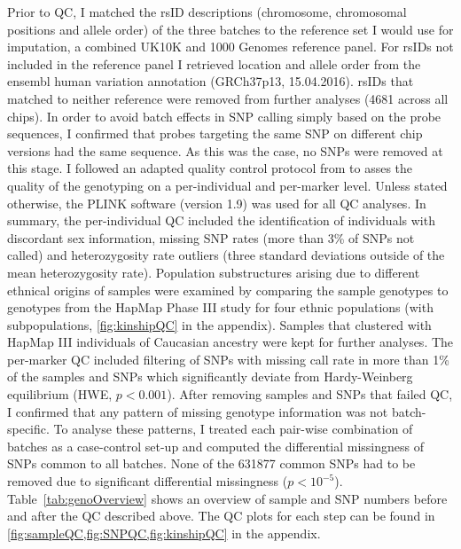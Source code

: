 Prior to QC, I matched the rsID descriptions (chromosome, chromosomal positions and allele order) of the three batches to the reference set I would use for imputation, a combined UK10K \citep{UK10KConsortium2015} and \num{1000} Genomes \citep{1000Genomes2015} reference panel. For rsIDs not included in the reference panel I retrieved location and allele order from the ensembl human variation annotation (GRCh37p13, 15.04.2016). rsIDs that matched to neither reference were removed from further analyses (\num{4681} across all chips). In order to avoid batch effects in SNP calling simply based on the probe sequences, I confirmed that probes targeting the same SNP on different chip versions had the same sequence. As this was the case, no SNPs were removed at this stage. 
I followed an adapted quality control protocol from \citet{Anderson2010} to asses the quality of the genotyping on a per-individual and per-marker level. Unless stated otherwise, the PLINK software (version 1.9) \citep{Purcell2007, Chang2015} was used for all QC analyses. In summary, the per-individual QC included the identification of individuals with discordant sex information, missing SNP rates (more than 3\% of SNPs not called) and heterozygosity rate outliers (three standard deviations outside of the mean heterozygosity rate). Population substructures arising due to different ethnical origins of samples were examined by comparing the sample genotypes to genotypes from the HapMap Phase III study \citep{HapMap2005} for four ethnic populations (with subpopulations, \cref{fig:kinshipQC} in the appendix). Samples that clustered with HapMap III individuals of Caucasian ancestry were kept for further analyses. The per-marker QC included filtering of SNPs with missing call rate in more than \num{1}\% of the samples and SNPs which significantly deviate from Hardy-Weinberg equilibrium (HWE, \(p < 0.001\)). After removing samples and SNPs that failed QC, I confirmed that any pattern of missing genotype information was not batch-specific. To analyse these patterns, I treated each pair-wise combination of batches as a case-control set-up and computed the differential missingness of SNPs common to all batches. None of the \num{631877} common SNPs had to be removed due to significant differential missingness (\(p < 10^{-5}\)). Table~\ref{tab:genoOverview} shows an overview of sample and SNP numbers before and after the QC described above. The QC plots for each step can be found in \cref{fig:sampleQC,fig:SNPQC,fig:kinshipQC} in the appendix. 
\\
